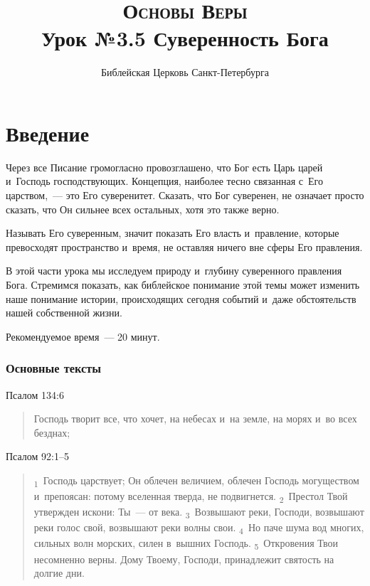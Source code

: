 \documentclass[a4paper,12pt]{article}
\title{\textsc{Основы Веры}\\Урок №3.5 Суверенность Бога}
\author{Библейская Церковь Санкт-Петербурга}
\date{}
\begin{document}
\maketitle

\thispagestyle{empty}




\section*{Введение}

Через все Писание громогласно провозглашено, что Бог есть Царь царей и~Господь господствующих. Концепция, наиболее тесно связанная с~Его царством,~--- это Его суверенитет. Сказать, что Бог суверенен, не означает просто сказать, что Он сильнее всех остальных, хотя это также верно.

Называть Его суверенным, значит показать Его власть и~правление, которые превосходят пространство и~время, не оставляя ничего вне сферы Его правления.

В этой части урока мы исследуем природу и~глубину суверенного правления Бога. Стремимся показать, как библейское понимание этой темы может изменить наше понимание истории, происходящих сегодня событий и~даже обстоятельств нашей собственной жизни.

Рекомендуемое время~--- 20 минут.
        
\subsubsection*{Основные тексты}

Псалом 134:6

\begin{quote}
Господь творит все, что хочет, на небесах и~на земле, на морях и~во всех безднах;
\end{quote}

\noindent
Псалом 92:1–5

\begin{quote}
\textsubscript{1}~Господь царствует; Он облечен величием, облечен Господь могуществом и~препоясан: потому вселенная тверда, не подвигнется.
\textsubscript{2}~Престол Твой утвержден искони: Ты~--- от века.
\textsubscript{3}~Возвышают реки, Господи, возвышают реки голос свой, возвышают реки волны свои.
\textsubscript{4}~Но паче шума вод многих, сильных волн морских, силен в~вышних Господь.
\textsubscript{5}~Откровения Твои несомненно верны. Дому Твоему, Господи, принадлежит святость на долгие дни. 
\end{quote}
\end{document}
